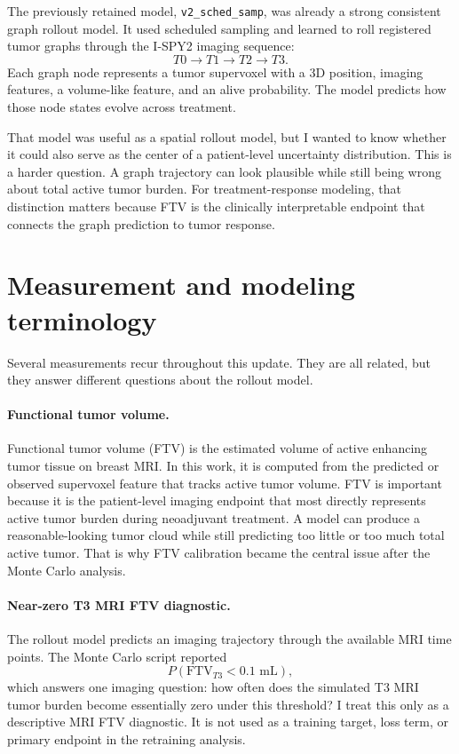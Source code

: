 \documentclass[11pt]{article}
\begin{document}
The previously retained model, \texttt{v2\_sched\_samp}, was already a strong
consistent graph rollout model. It used scheduled sampling and learned to roll
registered tumor graphs through the I-SPY2 imaging sequence:
\[
T0 \rightarrow T1 \rightarrow T2 \rightarrow T3.
\]
Each graph node represents a tumor supervoxel with a 3D position, imaging
features, a volume-like feature, and an alive probability. The model predicts
how those node states evolve across treatment.

That model was useful as a spatial rollout model, but I wanted to know whether
it could also serve as the center of a patient-level uncertainty distribution.
This is a harder question. A graph trajectory can look plausible while still
being wrong about total active tumor burden. For treatment-response modeling,
that distinction matters because FTV is the clinically interpretable endpoint
that connects the graph prediction to tumor response.

\section{Measurement and modeling terminology}

Several measurements recur throughout this update. They are all related, but
they answer different questions about the rollout model.

\paragraph{Functional tumor volume.}
Functional tumor volume (FTV) is the estimated volume of active enhancing tumor
tissue on breast MRI. In this work, it is computed from the predicted or
observed supervoxel feature that tracks active tumor volume. FTV is important
because it is the patient-level imaging endpoint that most directly represents
active tumor burden during neoadjuvant treatment. A model can produce a
reasonable-looking tumor cloud while still predicting too little or too much
total active tumor. That is why FTV calibration became the central issue after
the Monte Carlo analysis.

\paragraph{Near-zero T3 MRI FTV diagnostic.}
The rollout model predicts an imaging trajectory through the available MRI time
points. The Monte Carlo script reported
\[
P(\text{FTV}_{T3} < 0.1\text{ mL}),
\]
which answers one imaging question: how often does the simulated T3 MRI tumor
burden become essentially zero under this threshold? I treat this only as a
descriptive MRI FTV diagnostic. It is not used as a training target, loss term,
or primary endpoint in the retraining analysis.
\end{document}
